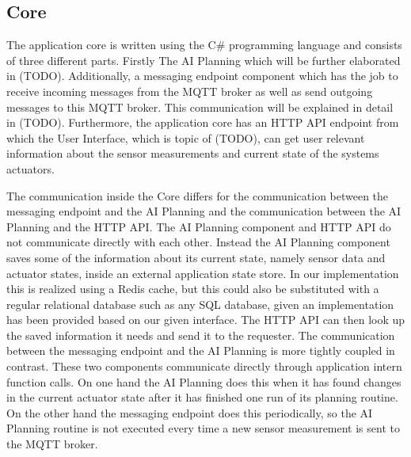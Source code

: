 \subsection{Core}\label{subsec:core}

The application core is written using the C\# programming language and consists of three different parts.
Firstly The AI Planning which will be further elaborated in (TODO).
Additionally, a messaging endpoint component which has the job to receive incoming messages from the MQTT broker as well as send outgoing messages to this MQTT broker.
This communication will be explained in detail in (TODO).
Furthermore, the application core has an HTTP API endpoint from which the User Interface, which is topic of (TODO), can get user relevant information about the sensor measurements and current state of the systems actuators.

The communication inside the Core differs for the communication between the messaging endpoint and the AI Planning and the communication between the AI Planning and the HTTP API.
The AI Planning component and HTTP API do not communicate directly with each other.
Instead the AI Planning component saves some of the information about its current state, namely sensor data and actuator states, inside an external application state store.
In our implementation this is realized using a Redis cache, but this could also be substituted with a regular relational database such as any SQL database, given an implementation has been provided based on our given interface.
The HTTP API can then look up the saved information it needs and send it to the requester.
The communication between the messaging endpoint and the AI Planning is more tightly coupled in contrast.
These two components communicate directly through application intern function calls.
On one hand the AI Planning does this when it has found changes in the current actuator state after it has finished one run of its planning routine.
On the other hand the messaging endpoint does this periodically, so the AI Planning routine is not executed every time a new sensor measurement is sent to the MQTT broker.
